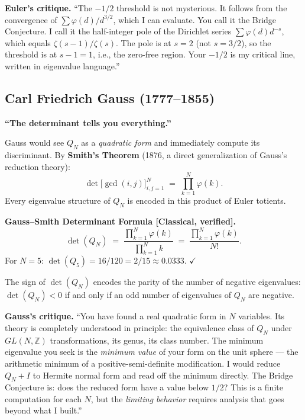 \documentclass[12pt]{article}
\begin{document}
\textbf{Euler's critique.}
``The $-1/2$ threshold is not mysterious. It follows from the convergence of
$\sum \varphi(d)/d^{3/2}$, which I can evaluate. You call it the Bridge Conjecture.
I call it the half-integer pole of the Dirichlet series $\sum \varphi(d) d^{-s}$,
which equals $\zeta(s-1)/\zeta(s)$. The pole is at $s = 2$ (not $s = 3/2$),
so the threshold is at $s - 1 = 1$, i.e., the zero-free region.
Your $-1/2$ is my critical line, written in eigenvalue language.''

\subsection*{Carl Friedrich Gauss (1777--1855)}

\textbf{``The determinant tells you everything.''}

Gauss would see $Q_N$ as a \emph{quadratic form} and immediately compute its discriminant.
By \textbf{Smith's Theorem} (1876, a direct generalization of Gauss's reduction theory):
\[
  \det\bigl[\gcd(i,j)\bigr]_{i,j=1}^N
  \;=\; \prod_{k=1}^N \varphi(k).
\]
Every eigenvalue structure of $Q_N$ is encoded in this product of Euler totients.

\begin{tcolorbox}[provedbox]
\textbf{Gauss--Smith Determinant Formula [Classical, verified].}
\[
  \det(Q_N) \;=\; \frac{\prod_{k=1}^N \varphi(k)}{\prod_{k=1}^N k}
  \;=\; \frac{\prod_{k=1}^N \varphi(k)}{N!}.
\]
For $N = 5$: $\det(Q_5) = 16/120 = 2/15 \approx 0.0333$. \hfill$\checkmark$

The sign of $\det(Q_N)$ encodes the parity of the number of negative eigenvalues:
$\det(Q_N) < 0$ if and only if an odd number of eigenvalues of $Q_N$ are negative.
\end{tcolorbox}

\textbf{Gauss's critique.}
``You have found a real quadratic form in $N$ variables.
Its theory is completely understood in principle:
the equivalence class of $Q_N$ under $GL(N,\mathbb{Z})$ transformations,
its genus, its class number.
The minimum eigenvalue you seek is the \emph{minimum value} of your form
on the unit sphere --- the arithmetic minimum of a positive-semi-definite
modification. I would reduce $Q_N + I$ to Hermite normal form
and read off the minimum directly.
The Bridge Conjecture is: does the reduced form have a value below $1/2$?
This is a finite computation for each $N$, but the \emph{limiting behavior}
requires analysis that goes beyond what I built.''
\end{document}
